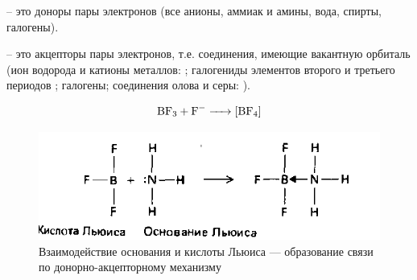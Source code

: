  – это доноры пары электронов (все анионы, аммиак и амины, вода, спирты, галогены).

 – это акцепторы пары электронов, т.е. соединения, имеющие вакантную орбиталь (ион водорода и катионы металлов: ; галогениды элементов второго и третьего периодов ; галогены; соединения олова и серы: ).

\begin{equation}
\ce{BF3 + F- ->}[\ce{BF4}]    
\end{equation}


\begin{figure}[H]
    \centering
    \includegraphics{17_luis.png}
    \caption{Взаимодействие основания и кислоты Льюиса — образование связи по донорно-акцепторному механизму}
    \label{fig:luis}
\end{figure}